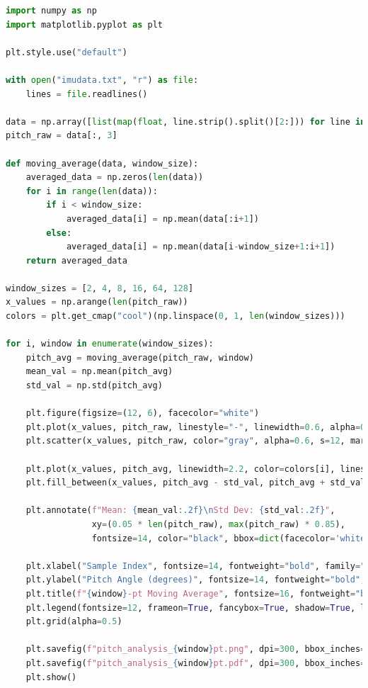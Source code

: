 \documentclass[a4paper,12pt]{article}
\begin{document}
\begin{lstlisting}[language=Python, caption={Python script for IMU data processing}]
import numpy as np
import matplotlib.pyplot as plt

plt.style.use("default")

with open("imudata.txt", "r") as file:
    lines = file.readlines()

data = np.array([list(map(float, line.strip().split()[2:])) for line in lines])
pitch_raw = data[:, 3]

def moving_average(data, window_size):
    averaged_data = np.zeros(len(data))
    for i in range(len(data)):
        if i < window_size:
            averaged_data[i] = np.mean(data[:i+1])
        else:
            averaged_data[i] = np.mean(data[i-window_size+1:i+1])
    return averaged_data

window_sizes = [2, 4, 8, 16, 64, 128]
x_values = np.arange(len(pitch_raw))
colors = plt.get_cmap("cool")(np.linspace(0, 1, len(window_sizes)))

for i, window in enumerate(window_sizes):
    pitch_avg = moving_average(pitch_raw, window)
    mean_val = np.mean(pitch_avg)
    std_val = np.std(pitch_avg)

    plt.figure(figsize=(12, 6), facecolor="white")  
    plt.plot(x_values, pitch_raw, linestyle="-", linewidth=0.6, alpha=0.3, color="gray")
    plt.scatter(x_values, pitch_raw, color="gray", alpha=0.6, s=12, marker="o", label="Raw Data")

    plt.plot(x_values, pitch_avg, linewidth=2.2, color=colors[i], linestyle="solid", alpha=0.85, label=f"{window}-pt Moving Average")
    plt.fill_between(x_values, pitch_avg - std_val, pitch_avg + std_val, color=colors[i], alpha=0.2)

    plt.annotate(f"Mean: {mean_val:.2f}\nStd Dev: {std_val:.2f}",
                 xy=(0.05 * len(pitch_raw), max(pitch_raw) * 0.85),
                 fontsize=14, color="black", bbox=dict(facecolor='white', edgecolor='gray', alpha=0.9))

    plt.xlabel("Sample Index", fontsize=14, fontweight="bold", family="serif")
    plt.ylabel("Pitch Angle (degrees)", fontsize=14, fontweight="bold", family="serif")
    plt.title(f"{window}-pt Moving Average", fontsize=16, fontweight="bold", color=colors[i], family="serif")
    plt.legend(fontsize=12, frameon=True, fancybox=True, shadow=True, loc="upper right")
    plt.grid(alpha=0.5)

    plt.savefig(f"pitch_analysis_{window}pt.png", dpi=300, bbox_inches="tight", facecolor="white")
    plt.savefig(f"pitch_analysis_{window}pt.pdf", dpi=300, bbox_inches="tight", facecolor="white")
    plt.show()
\end{lstlisting}
\end{document}
